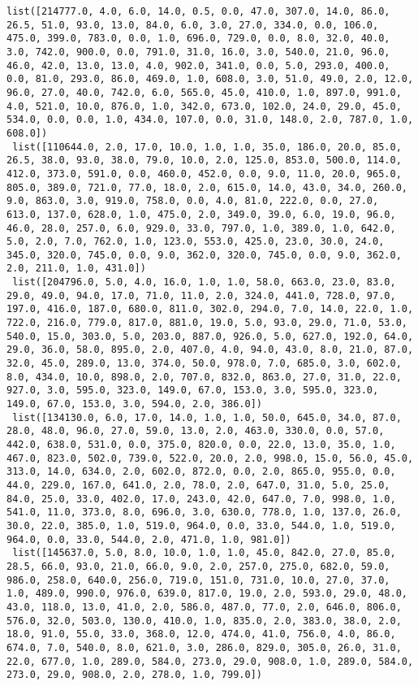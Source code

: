 \documentclass[11pt]{article}
\begin{document}
\begin{Verbatim}[commandchars=\\\{\}]
 list([214777.0, 4.0, 6.0, 14.0, 0.5, 0.0, 47.0, 307.0, 14.0, 86.0, 26.5, 51.0, 93.0, 13.0, 84.0, 6.0, 3.0, 27.0, 334.0, 0.0, 106.0, 475.0, 399.0, 783.0, 0.0, 1.0, 696.0, 729.0, 0.0, 8.0, 32.0, 40.0, 3.0, 742.0, 900.0, 0.0, 791.0, 31.0, 16.0, 3.0, 540.0, 21.0, 96.0, 46.0, 42.0, 13.0, 13.0, 4.0, 902.0, 341.0, 0.0, 5.0, 293.0, 400.0, 0.0, 81.0, 293.0, 86.0, 469.0, 1.0, 608.0, 3.0, 51.0, 49.0, 2.0, 12.0, 96.0, 27.0, 40.0, 742.0, 6.0, 565.0, 45.0, 410.0, 1.0, 897.0, 991.0, 4.0, 521.0, 10.0, 876.0, 1.0, 342.0, 673.0, 102.0, 24.0, 29.0, 45.0, 534.0, 0.0, 0.0, 1.0, 434.0, 107.0, 0.0, 31.0, 148.0, 2.0, 787.0, 1.0, 608.0])
 list([110644.0, 2.0, 17.0, 10.0, 1.0, 1.0, 35.0, 186.0, 20.0, 85.0, 26.5, 38.0, 93.0, 38.0, 79.0, 10.0, 2.0, 125.0, 853.0, 500.0, 114.0, 412.0, 373.0, 591.0, 0.0, 460.0, 452.0, 0.0, 9.0, 11.0, 20.0, 965.0, 805.0, 389.0, 721.0, 77.0, 18.0, 2.0, 615.0, 14.0, 43.0, 34.0, 260.0, 9.0, 863.0, 3.0, 919.0, 758.0, 0.0, 4.0, 81.0, 222.0, 0.0, 27.0, 613.0, 137.0, 628.0, 1.0, 475.0, 2.0, 349.0, 39.0, 6.0, 19.0, 96.0, 46.0, 28.0, 257.0, 6.0, 929.0, 33.0, 797.0, 1.0, 389.0, 1.0, 642.0, 5.0, 2.0, 7.0, 762.0, 1.0, 123.0, 553.0, 425.0, 23.0, 30.0, 24.0, 345.0, 320.0, 745.0, 0.0, 9.0, 362.0, 320.0, 745.0, 0.0, 9.0, 362.0, 2.0, 211.0, 1.0, 431.0])
 list([204796.0, 5.0, 4.0, 16.0, 1.0, 1.0, 58.0, 663.0, 23.0, 83.0, 29.0, 49.0, 94.0, 17.0, 71.0, 11.0, 2.0, 324.0, 441.0, 728.0, 97.0, 197.0, 416.0, 187.0, 680.0, 811.0, 302.0, 294.0, 7.0, 14.0, 22.0, 1.0, 722.0, 216.0, 779.0, 817.0, 881.0, 19.0, 5.0, 93.0, 29.0, 71.0, 53.0, 540.0, 15.0, 303.0, 5.0, 203.0, 887.0, 926.0, 5.0, 627.0, 192.0, 64.0, 29.0, 36.0, 58.0, 895.0, 2.0, 407.0, 4.0, 94.0, 43.0, 8.0, 21.0, 87.0, 32.0, 45.0, 289.0, 13.0, 374.0, 50.0, 978.0, 7.0, 685.0, 3.0, 602.0, 8.0, 434.0, 10.0, 898.0, 2.0, 707.0, 832.0, 863.0, 27.0, 31.0, 22.0, 927.0, 3.0, 595.0, 323.0, 149.0, 67.0, 153.0, 3.0, 595.0, 323.0, 149.0, 67.0, 153.0, 3.0, 594.0, 2.0, 386.0])
 list([134130.0, 6.0, 17.0, 14.0, 1.0, 1.0, 50.0, 645.0, 34.0, 87.0, 28.0, 48.0, 96.0, 27.0, 59.0, 13.0, 2.0, 463.0, 330.0, 0.0, 57.0, 442.0, 638.0, 531.0, 0.0, 375.0, 820.0, 0.0, 22.0, 13.0, 35.0, 1.0, 467.0, 823.0, 502.0, 739.0, 522.0, 20.0, 2.0, 998.0, 15.0, 56.0, 45.0, 313.0, 14.0, 634.0, 2.0, 602.0, 872.0, 0.0, 2.0, 865.0, 955.0, 0.0, 44.0, 229.0, 167.0, 641.0, 2.0, 78.0, 2.0, 647.0, 31.0, 5.0, 25.0, 84.0, 25.0, 33.0, 402.0, 17.0, 243.0, 42.0, 647.0, 7.0, 998.0, 1.0, 541.0, 11.0, 373.0, 8.0, 696.0, 3.0, 630.0, 778.0, 1.0, 137.0, 26.0, 30.0, 22.0, 385.0, 1.0, 519.0, 964.0, 0.0, 33.0, 544.0, 1.0, 519.0, 964.0, 0.0, 33.0, 544.0, 2.0, 471.0, 1.0, 981.0])
 list([145637.0, 5.0, 8.0, 10.0, 1.0, 1.0, 45.0, 842.0, 27.0, 85.0, 28.5, 66.0, 93.0, 21.0, 66.0, 9.0, 2.0, 257.0, 275.0, 682.0, 59.0, 986.0, 258.0, 640.0, 256.0, 719.0, 151.0, 731.0, 10.0, 27.0, 37.0, 1.0, 489.0, 990.0, 976.0, 639.0, 817.0, 19.0, 2.0, 593.0, 29.0, 48.0, 43.0, 118.0, 13.0, 41.0, 2.0, 586.0, 487.0, 77.0, 2.0, 646.0, 806.0, 576.0, 32.0, 503.0, 130.0, 410.0, 1.0, 835.0, 2.0, 383.0, 38.0, 2.0, 18.0, 91.0, 55.0, 33.0, 368.0, 12.0, 474.0, 41.0, 756.0, 4.0, 86.0, 674.0, 7.0, 540.0, 8.0, 621.0, 3.0, 286.0, 829.0, 305.0, 26.0, 31.0, 22.0, 677.0, 1.0, 289.0, 584.0, 273.0, 29.0, 908.0, 1.0, 289.0, 584.0, 273.0, 29.0, 908.0, 2.0, 278.0, 1.0, 799.0])

\end{Verbatim}
\end{document}
